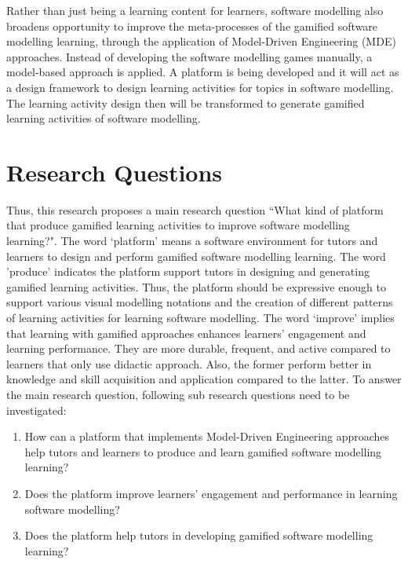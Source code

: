 \documentclass[12pt, a4paper]{report} \usepackage[titletoc]{appendix}
\begin{document}
Rather than just being a learning content for learners, software modelling also broadens opportunity to improve the meta-processes of the gamified software modelling learning, through the application of Model-Driven Engineering (MDE) approaches. Instead of developing the software modelling games manually, a model-based approach is applied. A platform is being developed and it will act as a design framework to design learning activities for topics in software modelling. The learning activity design then will be transformed to generate gamified learning activities of software modelling. 

\section{Research Questions}
Thus, this research proposes a main research question ``What kind of platform that produce gamified learning activities to improve software modelling learning?". The word `platform' means a software environment for tutors and learners to design and perform gamified software modelling learning. The word 'produce' indicates the platform support tutors in designing and generating gamified learning activities. Thus, the platform should be expressive enough to support various visual modelling notations and the creation of different patterns of learning activities for learning software modelling. The word `improve' implies that learning with gamified approaches enhances learners' engagement and learning performance. They are more durable, frequent, and active compared to learners that only use didactic approach. Also, the former perform better in knowledge and skill acquisition and application compared to the latter. To answer the main research question, following sub research questions need to be investigated:
\begin{enumerate}
\item How can a platform that implements Model-Driven Engineering approaches help tutors and learners to produce and learn gamified software modelling learning?
\item Does the platform improve learners' engagement and performance in learning software modelling?
\item Does the platform help tutors in developing gamified software modelling learning?
\end{enumerate}
\end{document}
